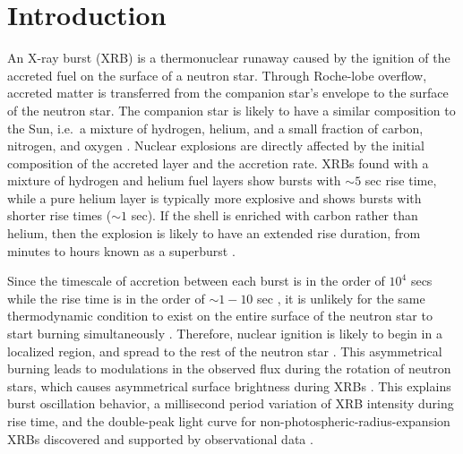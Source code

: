 \documentclass[preprint,times,tighten]{aastex631}
\newcommand{\MarginPar}[1]{
    \marginpar{\vskip-\baselineskip%
               \raggedright%
               \tiny\sffamily%
               {\color{red}\hrule%
               \smallskip%
               #1\par%
               \smallskip%
               \hrule}}%
}
\begin{document}

\section{Introduction}\label{Sec:Introduction}

An X-ray burst (XRB) is a thermonuclear runaway caused by the ignition of the accreted fuel on the surface of a neutron star. Through Roche-lobe overflow, accreted matter is transferred from the companion star's envelope to the surface of the neutron star. The companion star is likely to have a similar composition to the Sun, i.e.\ a mixture of hydrogen, helium, and a small fraction of carbon, nitrogen, and oxygen \citep{Galloway_2020_basics_of_xrb}. Nuclear explosions are directly affected by the initial composition of the accreted layer and the accretion rate. XRBs found with a mixture of hydrogen and helium fuel layers show bursts with $\sim 5$ sec rise time, while a pure helium layer is typically more explosive and shows bursts with shorter rise times ($\sim 1$ sec). If the shell is enriched with carbon rather than helium, then the explosion is likely to have an extended rise duration, from minutes to hours known as a superburst \citep{Kuulkers_2002,Cumming_2001,Gupta_2007}. 

Since the timescale of accretion between each burst is in the order of $10^4$ secs while the rise time is in the order of $\sim 1 - 10$ sec \citep{Parikh_2013}, it is unlikely for the same thermodynamic condition to exist on the entire surface of the neutron star to start burning simultaneously \citep{Shara_1982}. Therefore, nuclear ignition is likely to begin in a localized region, and spread to the rest of the neutron star \citep{Spitkovsky_2002}. This asymmetrical burning leads to modulations in the observed flux during the rotation of neutron stars, which causes asymmetrical surface brightness during XRBs \citep{strohmayer_2009}. This explains burst oscillation behavior, a millisecond period variation of XRB intensity during rise time, and the double-peak light curve for non-photospheric-radius-expansion XRBs discovered and supported by observational data \citep{Altamirano_2010,Chakraborty_2014,Bhattacharyya_2006, Kaaret_2007,Smith_1997}.  
\end{document}
